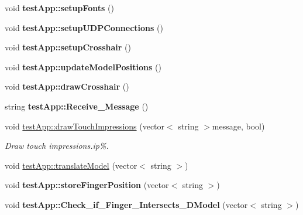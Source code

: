 \begin{DoxyCompactItemize}
\item 
\hypertarget{group___int_variables_ga210397e42daad5b2ded2b80598905827}{void {\bfseries test\-App\-::setup\-Fonts} ()}\label{group___int_variables_ga210397e42daad5b2ded2b80598905827}

\item 
\hypertarget{group___int_variables_ga0d5c58a4c1ebdb291618b34d5237f77b}{void {\bfseries test\-App\-::setup\-U\-D\-P\-Connections} ()}\label{group___int_variables_ga0d5c58a4c1ebdb291618b34d5237f77b}

\item 
\hypertarget{group___int_variables_gaae96728967b563fab5b52350915829b7}{void {\bfseries test\-App\-::setup\-Crosshair} ()}\label{group___int_variables_gaae96728967b563fab5b52350915829b7}

\item 
\hypertarget{group___int_variables_ga4f0adc57489b13878194958d0f2da032}{void {\bfseries test\-App\-::update\-Model\-Positions} ()}\label{group___int_variables_ga4f0adc57489b13878194958d0f2da032}

\item 
\hypertarget{group___int_variables_ga9d57148d51d852b0fe1051ee150f0fc0}{void {\bfseries test\-App\-::draw\-Crosshair} ()}\label{group___int_variables_ga9d57148d51d852b0fe1051ee150f0fc0}

\item 
\hypertarget{group___int_variables_ga9388efd101d9850bdf41ed036861e369}{string {\bfseries test\-App\-::\-Receive\-\_\-\-Message} ()}\label{group___int_variables_ga9388efd101d9850bdf41ed036861e369}

\item 
void \hyperlink{group___int_variables_ga12fd724a9073e84f1367d01f97d222d8}{test\-App\-::draw\-Touch\-Impressions} (vector$<$ string $>$message, bool)
\begin{DoxyCompactList}\small\item\em Draw touch impressions.ip\%. \end{DoxyCompactList}\item 
void \hyperlink{group___int_variables_ga8afafb31eb516994348caaf54bdea6bb}{test\-App\-::translate\-Model} (vector$<$ string $>$)
\item 
\hypertarget{group___int_variables_gaff620776a9cf806d8555de9a501fdcee}{void {\bfseries test\-App\-::store\-Finger\-Position} (vector$<$ string $>$)}\label{group___int_variables_gaff620776a9cf806d8555de9a501fdcee}

\item 
\hypertarget{group___int_variables_ga5631a4b034f1558b451fed3868480222}{void {\bfseries test\-App\-::\-Check\-\_\-if\-\_\-\-Finger\-\_\-\-Intersects\-\_\-D\-Model} (vector$<$ string $>$)}\label{group___int_variables_ga5631a4b034f1558b451fed3868480222}


\end{DoxyCompactItemize}
